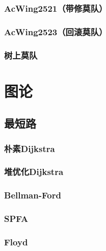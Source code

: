 \documentclass[12pt,a4paper]{article}
\begin{document}
\subsubsection{AcWing2521（带修莫队）}
\begin{spacing}{1.5}

\end{spacing}

\subsubsection{AcWing2523（回滚莫队）}
\begin{spacing}{1.5}

\end{spacing}

\subsubsection{树上莫队}
\begin{spacing}{1.5}

\end{spacing}
\section{图论}
\subsection{最短路}
\subsubsection{朴素Dijkstra}

\subsubsection{堆优化Dijkstra}

\subsubsection{Bellman-Ford}

\subsubsection{SPFA}

\subsubsection{Floyd}

\end{document}
